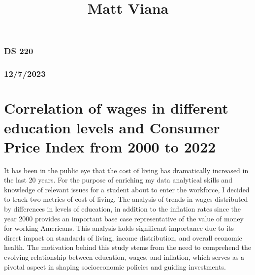 \documentclass[
  letterpaper,
  DIV=11,
  numbers=noendperiod]{scrartcl}
\title{Matt Viana}
\author{}
\date{}
\begin{document}
\maketitle
\ifdefined\Shaded\renewenvironment{Shaded}{\begin{tcolorbox}[sharp corners, borderline west={3pt}{0pt}{shadecolor}, boxrule=0pt, frame hidden, breakable, enhanced, interior hidden]}{\end{tcolorbox}}\fi

\hypertarget{ds-220}{%
\subsubsection{DS 220}\label{ds-220}}

\hypertarget{section}{%
\subsubsection{12/7/2023}\label{section}}

\hypertarget{correlation-of-wages-in-different-education-levels-and-consumer-price-index-from-2000-to-2022}{%
\section{Correlation of wages in different education levels and Consumer
Price Index from 2000 to
2022}\label{correlation-of-wages-in-different-education-levels-and-consumer-price-index-from-2000-to-2022}}

It has been in the public eye that the cost of living has dramatically
increased in the last 20 years. For the purpose of enriching my data
analytical skills and knowledge of relevant issues for a student about
to enter the workforce, I decided to track two metrics of cost of
living. The analysis of trends in wages distributed by differences in
levels of education, in addition to the inflation rates since the year
2000 provides an important base case representative of the value of
money for working Americans. This analysis holds significant importance
due to its direct impact on standards of living, income distribution,
and overall economic health. The motivation behind this study stems from
the need to comprehend the evolving relationship between education,
wages, and inflation, which serves as a pivotal aspect in shaping
socioeconomic policies and guiding investments.
\end{document}
